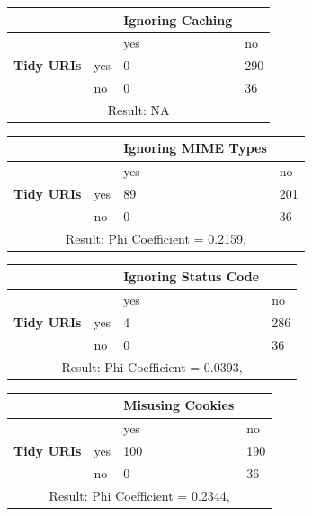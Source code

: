 \documentclass[a4paper,12pt]{article}
\begin{document}
\begin{center}
  \begin{tabular}{| p{60mm} | p{10mm} | p{35mm} | p{35mm} |}
  \hline
   & & \textbf{Ignoring Caching} &
  \\
  \hline
  & & yes & no
  \\
  \hline
  \textbf{Tidy URIs} & yes & 0 & 290
  \\
  \hline
   & no & 0 & 36
  \\
  \hline
  \multicolumn{4}{|c|}{Result: NA}
  \\ \hline
  \end{tabular}
  \end{center}

\begin{center}
  \begin{tabular}{| p{60mm} | p{10mm} | p{35mm} | p{35mm} |}
  \hline
   & & \textbf{Ignoring MIME Types} &
  \\
  \hline
  & & yes & no
  \\
  \hline
  \textbf{Tidy URIs} & yes & 89 & 201
  \\
  \hline
   & no & 0 & 36
  \\
  \hline
  \multicolumn{4}{|c|}{Result: Phi Coefficient = 0.2159, }
  \\ \hline
  \end{tabular}
  \end{center}

\begin{center}
  \begin{tabular}{| p{60mm} | p{10mm} | p{35mm} | p{35mm} |}
  \hline
   & & \textbf{Ignoring Status Code} &
  \\
  \hline
  & & yes & no
  \\
  \hline
  \textbf{Tidy URIs} & yes & 4 & 286
  \\
  \hline
   & no & 0 & 36
  \\
  \hline
  \multicolumn{4}{|c|}{Result: Phi Coefficient = 0.0393, }
  \\ \hline
  \end{tabular}
  \end{center}

\begin{center}
  \begin{tabular}{| p{60mm} | p{10mm} | p{35mm} | p{35mm} |}
  \hline
   & & \textbf{Misusing Cookies} &
  \\
  \hline
  & & yes & no
  \\
  \hline
  \textbf{Tidy URIs} & yes & 100 & 190
  \\
  \hline
   & no & 0 & 36
  \\
  \hline
  \multicolumn{4}{|c|}{Result: Phi Coefficient = 0.2344, }
  \\ \hline
  \end{tabular}
  \end{center}
\end{document}
